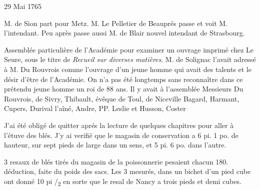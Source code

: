                      \begin{diary}{29 Mai 1765}{}
                        
                        
                           M. de Sion part pour Metz. M. Le Pelletier
                              de Beauprés passe et voit M. l'intendant.
                           Peu après passe aussi M. de Blair
                           nouvel intendant de Strasbourg. \bigskip
        
        
                         Assemblée particulière de l'Académie pour
                           examiner un ouvrage imprimé chez
                           Le Seure,
                           sous le titre de \emph{\emph{Recueil sur
                                 diverses matières}}.
                           M. de Solignac l'avait
                           adressé à M. Du Rouvrois
                           comme l'ouvrage d'un jeune homme qui avait
                           des talents et le désir d'être de l'Académie. On
                           n'a pas été longtemps sans reconnaître dans ce
                           prétendu jeune homme un roi
                              de 88 ans.
                           Il y avait à l'assemblée Messieurs
                           Du Rouvrois,
                           de Sivry, Thibault, évêque de Toul, de
                              Niceville
                           Bagard, Harmant, Cupers,
                              Durival l'aîné,
                           Andre, PP. Leslie et Husson,
                              Coster
                        \bigskip
        
        
                         J'ai été obligé de quitter aprés la
                           lecture de
                           quelques chapitres pour aller à l'étuve des
                              blés. J'y
                           ai verifié que le magasin de
                           conservation a 6 pi. 1 po.
                           de hauteur, sur
                           sept pieds de large dans un
                           sens, et 5 pi. 6 po.
                           dans l'autre. \bigskip
        
        
                         3 resaux de blés tirés du magasin
                              de la
                              poissonnerie pesaient chacun 180. déduction, faite du poids des sacs. Les 3 mesurés,
                           dans un bichet d'un pied cube ont donné
                           10 pi /\textsubscript{2} en sorte que le
                           resal de Nancy a
                           trois pieds et demi cubes. \bigskip
        

\end{diary}

